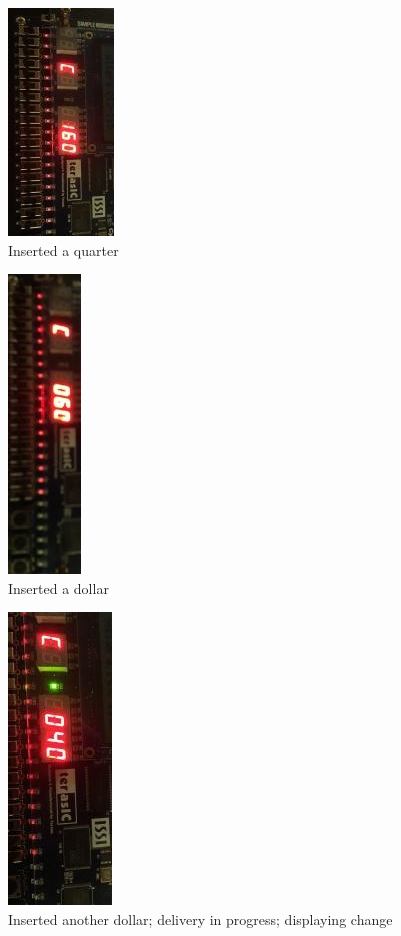 \documentclass[12pt]{article}
\begin{document}
\begin{figure}[H]
\begin{center}
\includegraphics[scale=1.0,angle=90]{C160.png}
\caption{Inserted a quarter}
\label{fig:board4}
\end{center}
\end{figure}

\begin{figure}[H]
\begin{center}
\includegraphics[scale=1.0,angle=90]{C60.png}
\caption{Inserted a dollar}
\label{fig:board5}
\end{center}
\end{figure}

\begin{figure}[H]
\begin{center}
\includegraphics[scale=1.0,angle=90]{C40Delivery.png}
\caption{Inserted another dollar; delivery in progress; displaying change}
\label{fig:board6}
\end{center}
\end{figure}
\end{document}
